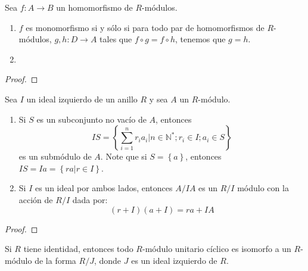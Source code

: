 \documentclass[12pt]{report}
\newcounter{it}
\theoremstyle{largebreak}
\newcommand\cf[3]{\ensuremath{#1:#2\rightarrow#3}}
\begin{document}
    \begin{excer}
        Sea $\cf{f}{A}{B}$ un homomorfismo de $R$-módulos.
        \begin{enumerate}[label = \textit{(\alph*)}]
            \item $f$ es monomorfismo si y sólo si para todo par de homomorfismos de $R$-módulos, $\cf{g,h}{D}{A}$ tales que $f\circ g=f\circ h$, tenemos que $g=h$.
            \item 
        \end{enumerate}
    \end{excer}

    \begin{proof}
        
    \end{proof}

    \begin{excer}
        Sea $I$ un ideal izquierdo de un anillo $R$ y sea $A$ un $R$-módulo.
        \begin{enumerate}[label = \textit{(\alph*)}]
            \item Si $S$ es un subconjunto no vacío de $A$, entonces
            \begin{equation*}
                IS=\left\{\sum_{ i=1}^n r_ia_i\Big|n\in\mathbb{N}^*;r_i\in I;a_i\in S \right\}
            \end{equation*}
            es un submódulo de $A$. Note que si $S=\left\{a \right\}$, entonces $IS=Ia=\left\{ra\Big|r\in I \right\}$.
            \item Si $I$ es un ideal por ambos lados, entonces $A/IA$ es un $R/I$ módulo con la acción de $R/I$ dada por:
            \begin{equation*}
                (r+I)(a+I)=ra+IA
            \end{equation*}
        \end{enumerate}
    \end{excer}

    \begin{proof}
        
    \end{proof}

    \begin{excer}
        Si $R$ tiene identidad, entonces todo $R$-módulo unitario cíclico es isomorfo a un $R$-módulo de la forma $R/J$, donde $J$ es un ideal izquierdo de $R$.
    \end{excer}
\end{document}
